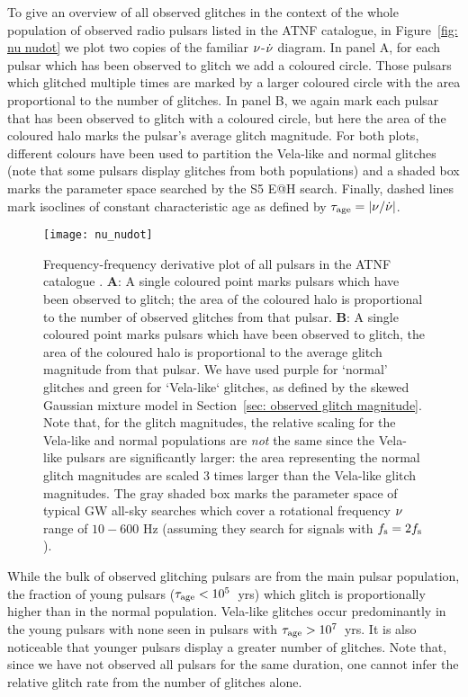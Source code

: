 \documentclass[../full_thesis/full_thesis.tex]{subfiles}
\begin{document}
To give an overview of all observed glitches in the context of the whole population of
observed radio pulsars listed in the ATNF catalogue, in Figure~\ref{fig: nu
nudot} we plot two copies of the familiar $\nu$-$\dot{\nu}$ diagram. In panel A, for each
pulsar which has been observed to glitch we add a coloured circle. Those
pulsars which glitched multiple times are marked by a larger coloured circle
with the area proportional to the number of glitches. In panel B, we again mark
each pulsar that has been observed to glitch with a coloured circle, but here
the area of the coloured halo marks the pulsar's average glitch magnitude.
For both plots, different
colours have been used to partition the Vela-like and normal glitches (note that some
pulsars display glitches from both populations) and a shaded box marks the
parameter space searched by the S5 E@H search. Finally, dashed lines mark isoclines
of constant characteristic age as defined by $\tau_{\mathrm{age}} = \left|\nu/\dot{\nu}\right|$.
\begin{figure}[htb]
\centering
\texttt{[image: nu\_nudot]}
\caption{Frequency-frequency derivative plot of all pulsars in the ATNF
catalogue \citep{ATNF}. \textbf{A}: A single coloured point marks pulsars which have been
observed to glitch; the area of the coloured halo is proportional to the
number of observed glitches from that pulsar. \textbf{B}: A single coloured
point marks pulsars which have been observed to glitch, the area of the coloured
halo is proportional to the average glitch magnitude from that pulsar. We have used
purple for `normal' glitches and green for `Vela-like` glitches, as defined by
the skewed Gaussian mixture model in Section~\ref{sec: observed glitch magnitude}. Note
that, for the glitch magnitudes, the relative scaling for the Vela-like and
normal populations are \emph{not}
the same since the Vela-like pulsars are significantly larger: the area representing
the normal glitch magnitudes are scaled 3 times larger than the Vela-like glitch
magnitudes.
The gray shaded box marks the parameter space of typical GW all-sky searches which
cover a rotational frequency $\nu$ range of $10-600$ Hz (assuming they search for signals
with $f_{\textrm{s}}=2f_{\textrm{s}}$).}
\label{fig: nu nudot}
\end{figure}

While the bulk of observed glitching pulsars are from the main pulsar population, the
fraction of young pulsars ($\tau_{\mathrm{age}} < 10^{5}$~yrs) which glitch is proportionally
higher than in the normal population. Vela-like glitches occur predominantly
in the young pulsars with none seen in pulsars with $\tau_{\mathrm{age}} > 10^{7}$~yrs. It
is also noticeable that younger pulsars display a greater number of glitches. Note
that, since we have not observed all pulsars
for the same duration, one cannot infer the relative glitch rate from the
number of glitches alone.
\end{document}
